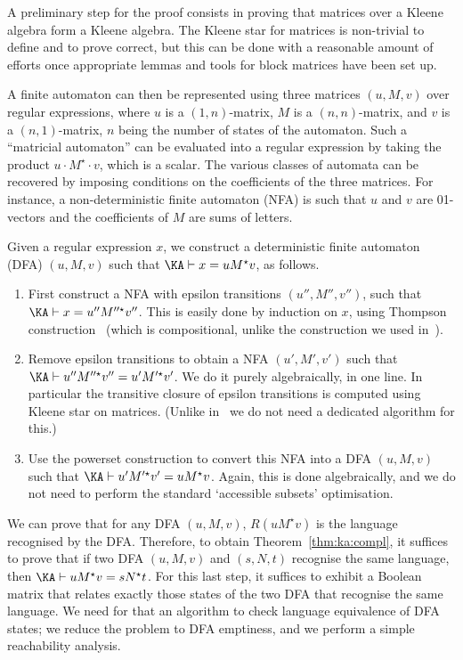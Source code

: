 \documentclass[a4paper]{llncs}
\begin{document}
\medskip

A preliminary step for the proof consists in proving that matrices
over a Kleene algebra form a Kleene algebra. The Kleene star for
matrices is non-trivial to define and to prove correct, but this can
be done with a reasonable amount of efforts once appropriate lemmas
and tools for block matrices have been set up.

A finite automaton can then be represented using three matrices
$(u,M,v)$ over regular expressions, where $u$ is a $(1,n)$-matrix, $M$
is a $(n,n)$-matrix, and $v$ is a $(n,1)$-matrix, $n$ being the number
of states of the automaton. Such a ``matricial automaton'' can be
evaluated into a regular expression by taking the product $u\cdot
M^\star\cdot v$, which is a scalar. The various classes of automata
can be recovered by imposing conditions on the coefficients of the
three matrices. For instance, a non-deterministic finite automaton
(NFA) is such that $u$ and $v$ are 01-vectors and the coefficients of
$M$ are sums of letters.

\medskip

Given a regular expression $x$, we construct a deterministic finite
automaton (DFA) $(u,M,v)$ such that $\KA\vdash x = uM^\star v$, as
follows.
\begin{enumerate}
\item First construct a NFA with epsilon transitions $(u'',M'',v'')$,
  such that $\KA\vdash x=u''M''^\star v''$. This is easily done by
  induction on $x$, using Thompson construction~\cite{thompson68}
  (which is compositional, unlike the construction we used
  in~\cite{bp:itp10:kacoq}).
\item Remove epsilon transitions to obtain a NFA $(u',M',v')$ such
  that $\KA\vdash u''M''^\star v'' = u'M'^\star v'$. We do it purely
  algebraically, in one line. In particular the transitive closure of
  epsilon transitions is computed using Kleene star on
  matrices. (Unlike in~\cite{bp:itp10:kacoq} we do not need a
  dedicated algorithm for this.)
\item Use the powerset construction to convert this NFA into a DFA
  $(u,M,v)$ such that $\KA\vdash u'M'^\star v' = uM^\star
  v$. Again, this is done algebraically, and we do not need to
  perform the standard `accessible subsets' optimisation.
\end{enumerate}
We can prove that for any DFA $(u,M,v)$, $R(uM^\star v)$ is the
language recognised by the DFA. Therefore, to obtain
Theorem~\ref{thm:ka:compl}, it suffices to prove that if two DFA
$(u,M,v)$ and $(s,N,t)$ recognise the same language, then $\KA\vdash
uM^\star v = sN^\star t$.
For this last step, it suffices to exhibit a Boolean matrix that
relates exactly those states of the two DFA that recognise the same
language. We need for that an algorithm to check language equivalence
of DFA states; we reduce the problem to DFA emptiness, and we perform a simple
reachability analysis.
\end{document}
